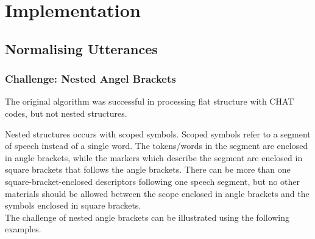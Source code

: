 \chapter{Implementation} %

\label{Chapter4} %


%

\section{Normalising Utterances}
\subsection{Challenge: Nested Angel Brackets}

The original algorithm was successful in processing flat structure with CHAT codes, but not nested structures. 

Nested structures occurs with scoped symbols. Scoped symbols refer to a segment of speech instead of a single word. The tokens/words in the segment are enclosed in angle brackets, while the markers which describe the segment are enclosed in square brackets that follows the angle brackets. There can be more than one square-bracket-enclosed descriptors following one speech segment, but no other materials should be allowed between the scope enclosed in angle brackets and the symbols enclosed in square brackets.\\
The challenge of nested angle brackets can be illustrated using the following examples.\\


